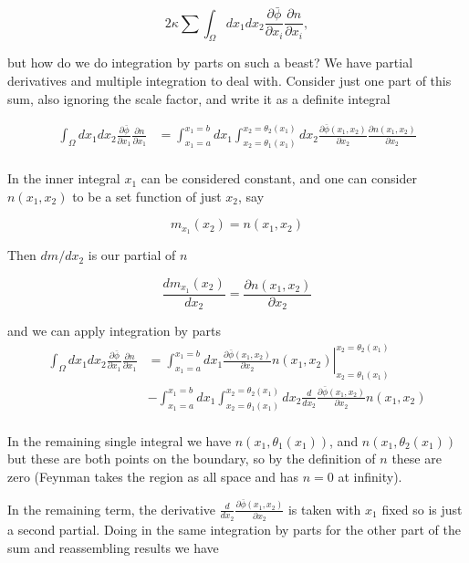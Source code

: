 \documentclass{article}
\newcommand{\PD}[2]{\frac{\partial {#2}}{\partial {#1}}}
\begin{document}
\begin{equation*}
2 \kappa \sum \int_{\Omega} dx_1 dx_2 \PD{x_i}{\bar{\phi}} \PD{x_i}{n},
\end{equation*}

but how do we do integration by parts on such a beast?  We have partial derivatives and multiple integration to deal with.  Consider just one part of this sum, also ignoring the scale factor, and write it as a definite integral

\begin{align*}
\int_{\Omega} dx_1 dx_2 \PD{x_1}{\bar{\phi}} \PD{x_1}{n}
&= \int_{x_1=a}^{x_1=b} dx_1 \int_{x_2 = \theta_1(x_1)}^{x_2 = \theta_2(x_1)} dx_2 \PD{x_2}{\bar{\phi}(x_1, x_2)} \PD{x_2}{n(x_1, x_2)} \\
\end{align*}

In the inner integral $x_1$ can be considered constant, and one can consider $n(x_1, x_2)$ to be a set function of just $x_2$, say

\begin{equation*}
m_{x_1}(x_2) = n(x_1, x_2)
\end{equation*}

Then $dm/dx_2$ is our partial of $n$

\begin{equation*}
\frac{d m_{x_1}(x_2)}{d x_2} = \PD{x_2}{n(x_1, x_2)}
\end{equation*}

and we can apply integration by parts
\begin{align*}
\int_{\Omega} dx_1 dx_2 \PD{x_1}{\bar{\phi}} \PD{x_1}{n} 
&= \int_{x_1=a}^{x_1=b} dx_1
\left. \PD{x_2}{\bar{\phi}(x_1, x_2)} n(x_1, x_2) \right\vert_{x_2 = \theta_1(x_1)}^{x_2 = \theta_2(x_1)} \\
&- \int_{x_1=a}^{x_1=b} dx_1 \int_{x_2 = \theta_1(x_1)}^{x_2 = \theta_2(x_1)} dx_2 \frac{d}{dx_2} \PD{x_2}{\bar{\phi}(x_1, x_2)} n(x_1, x_2) \\
\end{align*}

In the remaining single integral we have 
$n(x_1, \theta_1(x_1))$, and $n(x_1, \theta_2(x_1))$ but these are both points on the boundary, so by the definition of $n$ these are zero (Feynman takes the
region as all space and has $n=0$ at infinity).

In the remaining term, the derivative $\frac{d}{d x_2} \PD{x_2}{\bar{\phi}(x_1, x_2)}$ is taken with $x_1$ fixed so is just a second partial.
Doing in the same integration by parts for the other part of the sum and reassembling results we have
\end{document}
